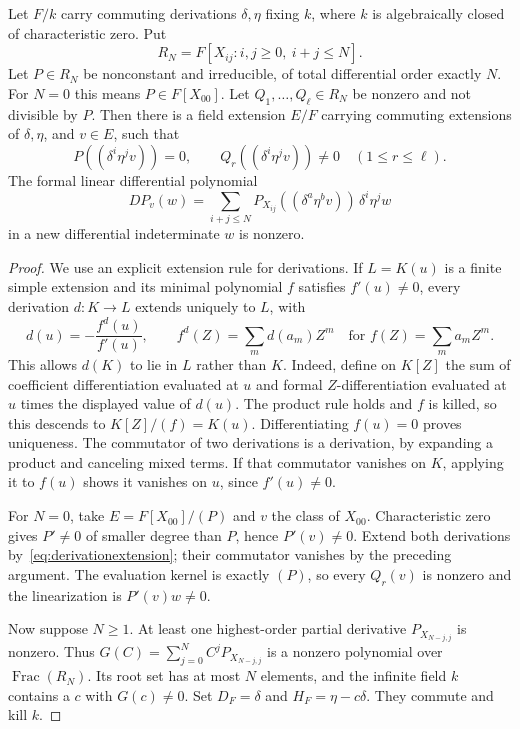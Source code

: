 \documentclass{article}
\newcommand{\Frac}{\operatorname{Frac}}
\begin{document}
\begin{lemma}\label{lem:branch}
Let $F/k$ carry commuting derivations $\delta,\eta$ fixing $k$, where $k$ is algebraically closed of characteristic zero. Put
\[
 R_N=F[X_{ij}:i,j\geq0,\ i+j\leq N].
\]
Let $P\in R_N$ be nonconstant and irreducible, of total differential order exactly $N$. For $N=0$ this means $P\in F[X_{00}]$. Let $Q_1,\ldots,Q_\ell\in R_N$ be nonzero and not divisible by $P$. Then there is a field extension $E/F$ carrying commuting extensions of $\delta,\eta$, and $v\in E$, such that
\[
 P((\delta^i\eta^jv))=0,\qquad Q_r((\delta^i\eta^jv))\ne0\quad(1\leq r\leq\ell).
\]
The formal linear differential polynomial
\[
 DP_v(w)=\sum_{i+j\leq N}P_{X_{ij}}((\delta^a\eta^bv))\,\delta^i\eta^jw
\]
in a new differential indeterminate $w$ is nonzero.
\end{lemma}
\begin{proof}
We use an explicit extension rule for derivations. If $L=K(u)$ is a finite simple extension and its minimal polynomial $f$ satisfies $f'(u)\ne0$, every derivation $d:K\to L$ extends uniquely to $L$, with
\[
 d(u)=-\frac{f^d(u)}{f'(u)},\qquad
 f^d(Z)=\sum_m d(a_m)Z^m\quad\text{for }f(Z)=\sum_m a_mZ^m.
 \tag{4.1}\label{eq:derivationextension}
\]
This allows $d(K)$ to lie in $L$ rather than $K$. Indeed, define on $K[Z]$ the sum of coefficient differentiation evaluated at $u$ and formal $Z$-differentiation evaluated at $u$ times the displayed value of $d(u)$. The product rule holds and $f$ is killed, so this descends to $K[Z]/(f)=K(u)$. Differentiating $f(u)=0$ proves uniqueness. The commutator of two derivations is a derivation, by expanding a product and canceling mixed terms. If that commutator vanishes on $K$, applying it to $f(u)$ shows it vanishes on $u$, since $f'(u)\ne0$.

For $N=0$, take $E=F[X_{00}]/(P)$ and $v$ the class of $X_{00}$. Characteristic zero gives $P'\ne0$ of smaller degree than $P$, hence $P'(v)\ne0$. Extend both derivations by~\eqref{eq:derivationextension}; their commutator vanishes by the preceding argument. The evaluation kernel is exactly $(P)$, so every $Q_r(v)$ is nonzero and the linearization is $P'(v)w\ne0$.

Now suppose $N\geq1$. At least one highest-order partial derivative $P_{X_{N-j,j}}$ is nonzero. Thus
$G(C)=\sum_{j=0}^N C^jP_{X_{N-j,j}}$ is a nonzero polynomial over $\Frac(R_N)$. Its root set has at most $N$ elements, and the infinite field $k$ contains a $c$ with $G(c)\ne0$. Set $D_F=\delta$ and $H_F=\eta-c\delta$. They commute and kill $k$.


\end{proof}
\end{document}
